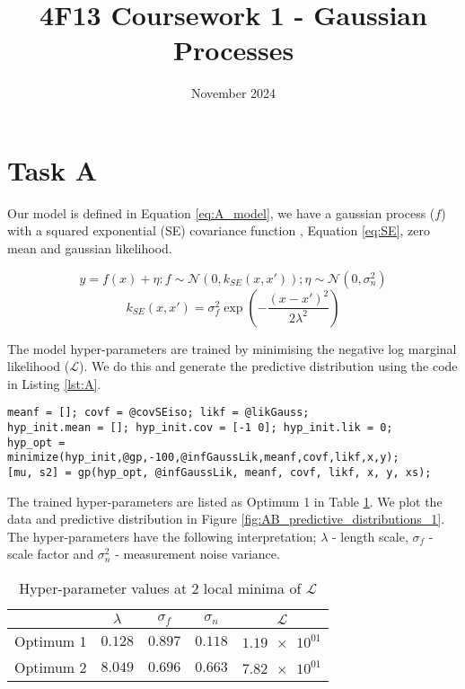 \documentclass[11pt]{article}
\title{\vspace{-2cm}4F13 Coursework 1 - Gaussian Processes}
\author{}
\date{November 2024}
\newcommand{\Lik}{\mathcal{L}}
\begin{document}


\maketitle
\section{Task A}

Our model is defined in Equation \ref{eq:A_model}, we have a gaussian process ($f$) with a squared exponential (SE) covariance function , Equation \ref{eq:SE}, zero mean and gaussian likelihood. 

\begin{equation}
    y = f(x) + \eta : f \sim \mathcal{N}(0, k_{SE}(x, x')); \eta \sim \mathcal{N}(0, \sigma_n^2)
    \label{eq:A_model}
\end{equation}
\begin{equation}
    k_{SE}(x,x') = \sigma_f^2 \exp(-\frac{(x-x')^2}{2\lambda^2})    \label{eq:SE}
\end{equation}

The model hyper-parameters are trained by minimising the negative log marginal likelihood ($\Lik$). We do this and generate the predictive distribution using the code in Listing \ref{lst:A}. 

\begin{lstlisting}[caption=Code to train hyper-parameters and generate the predictive distribution of a GP with squared exponential covariance, label=lst:A, captionpos=b, basicstyle=\small, frame=tlrb]
meanf = []; covf = @covSEiso; likf = @likGauss; 
hyp_init.mean = []; hyp_init.cov = [-1 0]; hyp_init.lik = 0;
hyp_opt = minimize(hyp_init,@gp,-100,@infGaussLik,meanf,covf,likf,x,y);
[mu, s2] = gp(hyp_opt, @infGaussLik, meanf, covf, likf, x, y, xs);
\end{lstlisting}

The trained hyper-parameters are listed as Optimum 1 in Table \ref{table:AB_hyper_parameters}. We plot the data and predictive distribution in Figure \ref{fig:AB_predictive_distributions_1}. The hyper-parameters have the following interpretation; $\lambda$ - length scale, $\sigma_f$ - scale factor and $\sigma_n^2$ - measurement noise variance.

\begin{table}[h]
    \centering
    \small
    \begin{tabular}{|c|c|c|c|c|}
        \hline
         & $\lambda$ & $\sigma_f$ & $\sigma_n$ & $\Lik$ \\
        \hline
        Optimum 1 & $0.128$ & $0.897$ & $0.118$ & $\num{1.19e+01}$ \\ 
        Optimum 2 & $8.049$ & $0.696$ & $0.663$ & $\num{7.82e+01}$ \\ 
        \hline
    \end{tabular}
    \caption{Hyper-parameter values at 2 local minima of $\Lik$}
    \label{table:AB_hyper_parameters}
\end{table}
\end{document}
